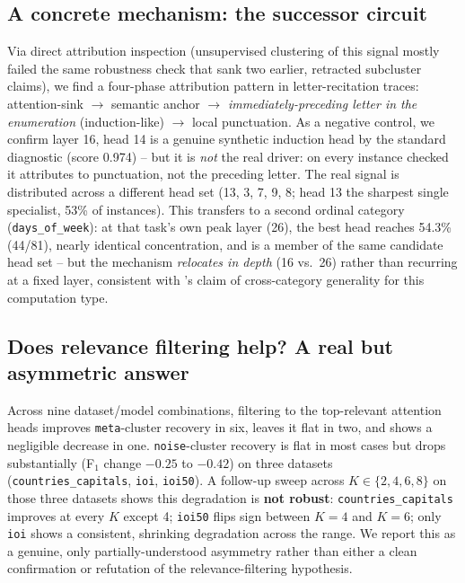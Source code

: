 \documentclass{article}
\theoremstyle{plain}
\theoremstyle{definition}
\theoremstyle{remark}
\begin{document}
\subsection{A concrete mechanism: the successor circuit}
\label{sec:results:successor}

Via direct attribution inspection (unsupervised clustering of this signal mostly failed
the same robustness check that sank two earlier, retracted subcluster claims), we find a
four-phase attribution pattern in letter-recitation traces: attention-sink $\to$
semantic anchor $\to$ \emph{immediately-preceding letter in the enumeration}
(induction-like) $\to$ local punctuation. As a negative control, we confirm layer 16,
head 14 is a genuine synthetic induction head by the standard diagnostic (score 0.974)
-- but it is \emph{not} the real driver: on every instance checked it attributes to
punctuation, not the preceding letter. The real signal is distributed across a
different head set (13, 3, 7, 9, 8; head 13 the sharpest single specialist, 53\% of
instances). This transfers to a second ordinal category (\texttt{days\_of\_week}): at
that task's own peak layer (26), the best head reaches 54.3\% (44/81), nearly identical
concentration, and is a member of the same candidate head set -- but the mechanism
\emph{relocates in depth} (16 vs.\ 26) rather than recurring at a fixed layer, consistent
with \citet{gould2024successor}'s claim of cross-category generality for this
computation type.

\subsection{Does relevance filtering help? A real but asymmetric answer}
\label{sec:results:lrp}

Across nine dataset/model combinations, filtering to the top-relevant attention heads
improves \texttt{meta}-cluster recovery in six, leaves it flat in two, and shows a
negligible decrease in one. \texttt{noise}-cluster recovery is flat in most cases but
drops substantially (F$_1$ change $-0.25$ to $-0.42$) on three datasets
(\texttt{countries\_capitals}, \texttt{ioi}, \texttt{ioi50}). A follow-up sweep across
$K\in\{2,4,6,8\}$ on those three datasets shows this degradation is \textbf{not robust}:
\texttt{countries\_capitals} improves at every $K$ except 4; \texttt{ioi50} flips sign
between $K=4$ and $K=6$; only \texttt{ioi} shows a consistent, shrinking degradation
across the range. We report this as a genuine, only partially-understood asymmetry
rather than either a clean confirmation or refutation of the relevance-filtering
hypothesis.
\end{document}
